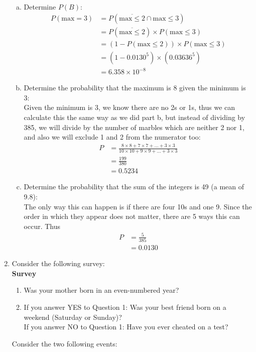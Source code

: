 \documentclass{scrartcl}
\begin{document}
\begin{enumerate}
\begin{enumerate}[a)]
    \item Determine $P(B)$:\\

      \begin{align*}
        P(\text{max}=3) &= P(\overline{\text{max}\le2} \cap \text{max}\le3)\\
                        &= P(\overline{\text{max}\le2}) \times P(\text{max}\le3)\\
                        &= (1 - P(\text{max}\le2)) \times P(\text{max}\le3)\\
                        &= (1 - 0.0130^5)\times(0.03636^5)\\
                        &= 6.358\times10^{-8}
      \end{align*}
      

    \item Determine the probability that the maximum is 8 given the minimum is 3:\\

      Given the minimum is 3, we know there are no 2s or 1s, thus we can calculate this the same way as we did part b, but instead of dividing by 385, we will divide by the number of marbles which are neither 2 nor 1, and also we will exclude 1 and 2 from the numerator too:
      \begin{align*}
        P &= \frac{8\times8 + 7\times7 + ... + 3\times3}{10\times10 + 9\times9 + ... + 3\times3}\\
          &= \frac{199}{380}\\
          &= 0.5234
      \end{align*}
      \pagebreak
    \item Determine the probability that the sum of the integers is 49 (a mean of 9.8):\\

      The only way this can happen is if there are four 10s and one 9. Since the order in which they appear does not matter, there are 5 ways this can occur. Thus
      \begin{align*}
        P &= \frac{5}{385}\\
          &= 0.0130
      \end{align*}
  \end{enumerate}


\item Consider the following survey:\\
  \textbf{Survey}
  \begin{enumerate}[1)]
    \item Was your mother born in an even-numbered year?
    \item If you answer YES to Question 1: Was your best friend born on a weekend (Saturday or Sunday)?\\
      If you answer NO to Question 1: Have you ever cheated on a test?
  \end{enumerate}
  Consider the two following events:


\end{enumerate}
\end{document}
